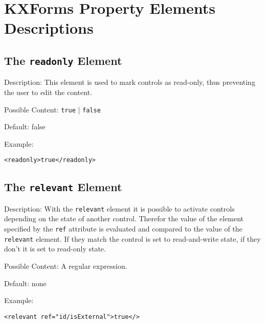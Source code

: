 \pagebreak 
\section{ KXForms Property Elements Descriptions}
\label{propertyelements}

\subsection{ The \texttt{readonly} Element}
\label{readonly}
\begin{description}
 \item Description: This element is used to mark controls as read-only, thus preventing the user to edit the content.

 \item Possible Content: \texttt{true} | \texttt{false}

 \item Default: false

 \item Example: 

\begin{lstlisting}[caption=\texttt{readonly} Element]
<readonly>true</readonly>
\end{lstlisting}
\end{description}





\subsection{ The \texttt{relevant} Element}
\label{relevant}
\begin{description}
 \item Description: With the \texttt{relevant} element it is possible to activate controls depending on the state of another control. Therefor the value of the element specified by the \texttt{ref} attribute is evaluated and compared to the value of the \texttt{relevant} element. If they match the control is set to read-and-write state, if they don't it is set to read-only state.

 \item Possible Content: A regular expression.

 \item Default: none

 \item Example: 

\begin{lstlisting}[caption=\texttt{relevant} Element]
<relevant ref="id/isExternal">true</>
\end{lstlisting}
\end{description}





